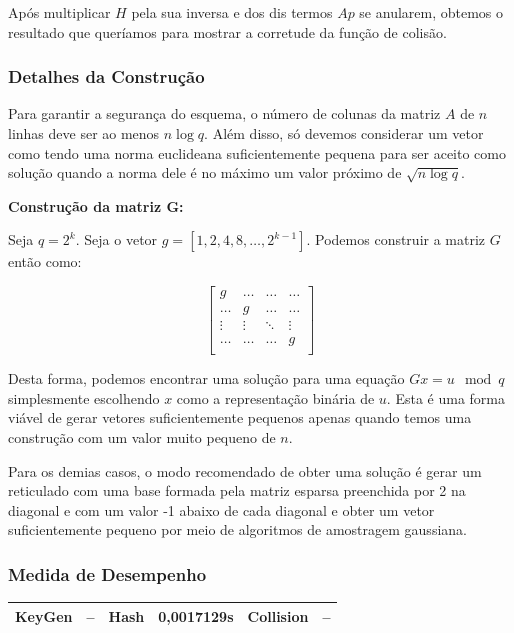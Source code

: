 \documentclass[a4paper]{article}
\begin{document}
    Após multiplicar $H$ pela sua inversa e dos dis termos $Ap$ se
    anularem, obtemos o resultado que queríamos para mostrar a corretude
    da função de colisão.
    
    \subsubsection{Detalhes da Construção}
    
    Para garantir a segurança do esquema, o número de colunas da matriz
    $A$ de $n$ linhas deve ser ao menos $n\log q$. Além disso, só devemos
    considerar um vetor como tendo uma norma euclideana suficientemente
    pequena para ser aceito como solução quando a norma dele é no máximo
    um valor próximo de $\sqrt{n \log q}$.
    
    \textbf{Construção da matriz G:}
    
    Seja $q=2^k$. Seja o vetor $g=[1, 2, 4, 8, \ldots, 2^{k-1}]$. Podemos
    construir a matriz $G$ então como:
    
    $$
    \left[\begin{matrix}
        g & \ldots & \ldots & \ldots\\
        \ldots & g & \ldots & \ldots\\
        \vdots & \vdots & \ddots & \vdots\\
        \ldots & \ldots & \ldots & g\\
      \end{matrix}\right]
    $$
    
    Desta forma, podemos encontrar uma solução para uma equação $Gx=u \mod
    q$ simplesmente escolhendo $x$ como a representação binária de
    $u$. Esta é uma forma viável de gerar vetores suficientemente pequenos
    apenas quando temos uma construção com um valor muito pequeno de $n$.
    
    Para os demias casos, o modo recomendado de obter uma solução é gerar
    um reticulado com uma base formada pela matriz esparsa preenchida por
    2 na diagonal e com um valor -1 abaixo de cada diagonal e obter um
    vetor suficientemente pequeno por meio de algoritmos de amostragem
    gaussiana.
    
    \subsubsection{Medida de Desempenho}
    
    \begin{center}
    \begin{tabular}{|c|c|c|c|c|c|}
      \hline
      KeyGen & -- & Hash & 0,0017129s & Collision & --\\
      \hline
    \end{tabular}
    \end{center}
    
\end{document}
